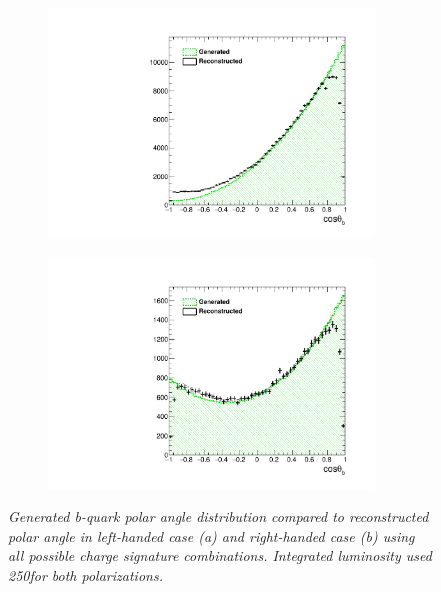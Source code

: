 \begin{figure}
	\centering
	\begin{subfigure}{0.5\textwidth}
		\includegraphics[width=0.95\textwidth]{ILD/plots/basymmetry-norec-nocorr-nobkg-left.pdf}
		\caption{\label{fig:BAsymmetryFirst_a_3} }
	\end{subfigure}%
	\begin{subfigure}{0.5\textwidth}
		\centering
			\includegraphics[width=0.95\textwidth]{ILD/plots/basymmetry-norec-nocorr-nobkg-right.pdf}
		\caption{\label{fig:BAsymmetryFirst_b_3} }
	\end{subfigure}
	\caption{\sl Generated b-quark polar angle distribution compared to reconstructed polar angle in left-handed case (a) and right-handed case (b) using all possible charge signature combinations. Integrated luminosity used 250\ifb for both polarizations. }
	\label{fig:BAsymmetryFirst_3}
\end{figure}

